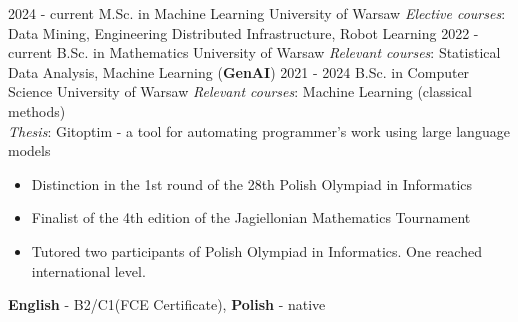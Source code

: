 \documentclass[8pt]{developercv} %
\begin{document}
\vspace{-15 pt}
\begin{entrylist}
    \entry
		{2024 - current}
		{M.Sc. in Machine Learning}
		{University of Warsaw}
		{\textsl{Elective courses}: Data Mining, Engineering Distributed Infrastructure, Robot Learning}
    \entry
		{2022 - current}
		{B.Sc. in Mathematics }
		{University of Warsaw}
		{\textsl{Relevant courses}: Statistical Data Analysis, Machine Learning (\textbf{GenAI})}
    \entry
		{2021 - 2024}
		{B.Sc. in Computer Science}
		{University of Warsaw}
		{\textsl{Relevant courses}: Machine Learning (classical methods)\\ \textsl{Thesis}: Gitoptim - a tool for automating programmer's work using large language models}
\end{entrylist}

\vspace{-15 pt}
\vspace{-10 pt}
\begin{itemize}[parsep=0pt,partopsep=0pt,leftmargin=26mm]
    \item Distinction in the 1st round of the 28th Polish Olympiad in Informatics
    \item Finalist of the 4th edition of the Jagiellonian Mathematics Tournament
    \item Tutored two participants of Polish Olympiad in Informatics. One reached international level.
\end{itemize}
 

\vspace{-7 pt}
    \vspace{-6pt}
    
    \hspace{26mm} \textbf{English} - B2/C1\hspace{3pt}(FCE Certificate), \textbf{ Polish} - native

\vspace{-5 pt}
    \vspace{-6pt}
    
\end{document}
